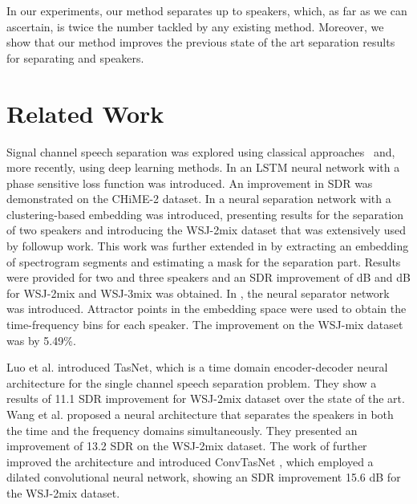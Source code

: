 \documentclass[a4paper]{article}
\begin{document}
In our experiments, our method separates up to  speakers, which, as far as we can ascertain, is twice the number tackled by any existing method. Moreover, we show that our method improves the previous state of the art separation results for separating  and  speakers. 

\section{Related Work}

Signal channel speech separation was explored using classical approaches~\cite{martin2018single,ernst2018speech} and, more recently, using deep learning methods. In \cite{erdogan2015phase} an LSTM neural network with a phase sensitive loss function was introduced. An improvement in SDR was demonstrated on the CHiME-2 \cite{vincent2013second} dataset. In \cite{hershey2016deep} a neural separation network with a clustering-based embedding was introduced, presenting results for the separation of two speakers and introducing the WSJ-2mix dataset that was extensively used by followup work. This work was further extended  in \cite{isik2016single} by  extracting an embedding of spectrogram segments and estimating a mask for the separation part. Results were provided for two and three speakers and an SDR improvement of  dB and  dB for WSJ-2mix and WSJ-3mix was obtained. In \cite{chen2017deep}, the neural separator network was introduced. Attractor points in the embedding space were used to obtain the time-frequency bins for each speaker. The improvement on the WSJ-mix dataset was by 5.49\%. 

Luo et al. \cite{luo2018tasnet} introduced TasNet, which is a time domain encoder-decoder neural architecture for the single channel speech separation problem. They show a results of 11.1 SDR improvement for WSJ-2mix dataset over the state of the art. Wang et al. \cite{wang2018end} proposed a neural architecture that separates the speakers in both the time and the frequency domains simultaneously. They presented an improvement of 13.2 SDR on the WSJ-2mix dataset. The work of \cite{luo2018tasnet} further improved the architecture and introduced ConvTasNet \cite{luo2019conv}, which employed a dilated convolutional neural network, showing an SDR improvement 15.6 dB for the WSJ-2mix dataset. 
\end{document}
